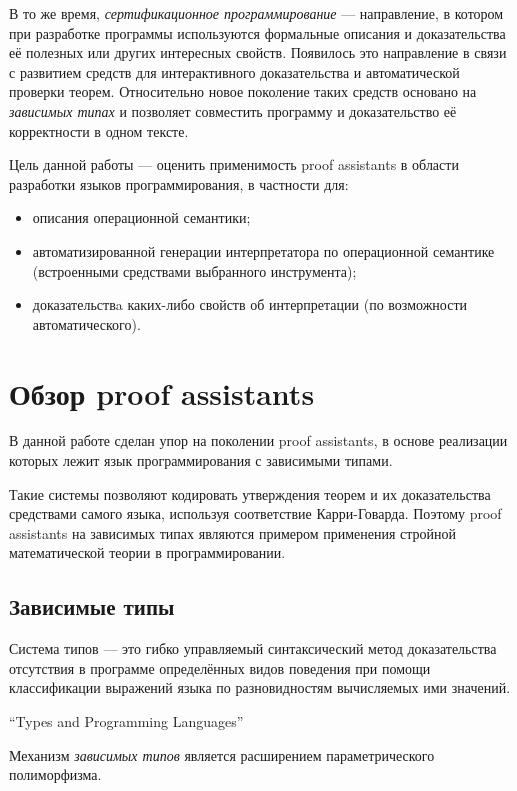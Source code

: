     В то же время, \emph{сертификационное программирование} --- направление, в котором при разработке программы используются формальные описания и доказательства её полезных или других интересных свойств. Появилось это направление в связи с развитием средств для интерактивного доказательства и автоматической проверки теорем. Относительно новое поколение таких средств основано на \emph{зависимых типах} и позволяет совместить программу и доказательство её корректности в одном тексте.

     Цель данной работы --- оценить применимость proof assistants в области разработки языков программирования, в частности для:
     \begin{itemize}
        \item описания операционной семантики;
        \item автоматизированной генерации интерпретатора по операционной семантике (встроенными средствами выбранного инструмента);
        \item доказательствa каких-либо свойств об интерпретации (по возможности автоматического).
     \end{itemize}

  \section{Обзор proof assistants}

     В данной работе сделан упор на поколении proof assistants, в основе реализации которых лежит язык программирования с зависимыми типами.

     Такие системы позволяют кодировать утверждения теорем и их доказательства средствами самого языка, используя соответствие Карри-Говарда. Поэтому proof assistants на зависимых типах являются примером применения стройной математической теории в программировании. 

  \subsection{Зависимые типы}

     \setlength{\epigraphwidth}{10cm}
     \epigraph{Система типов --- это гибко управляемый синтаксический метод доказательства отсутствия в программе определённых видов поведения при помощи классификации выражений языка по разновидностям вычисляемых ими значений.}{``Types and Programming Languages''\cite{Pierce:2002:TPL:509043}}

     Механизм \emph{зависимых типов} является расширением параметрического полиморфизма.

